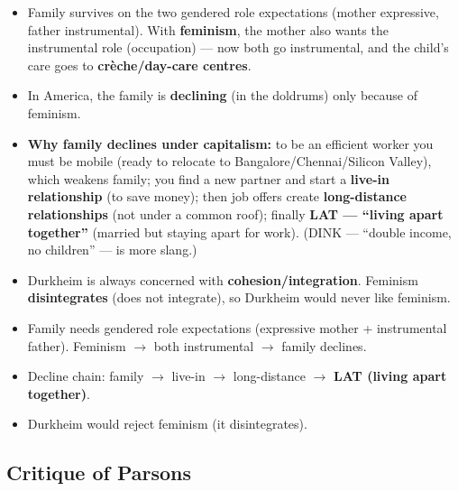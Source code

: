 \begin{CriticalPoint}
\begin{itemize}
\item Family survives on the two gendered role expectations (mother expressive, father instrumental). With \textbf{feminism}, the mother also wants the instrumental role (occupation) --- now both go instrumental, and the child's care goes to \textbf{crèche/day-care centres}.
\item In America, the family is \textbf{declining} (in the doldrums) only because of feminism.
\item \textbf{Why family declines under capitalism:} to be an efficient worker you must be mobile (ready to relocate to Bangalore/Chennai/Silicon Valley), which weakens family; you find a new partner and start a \textbf{live-in relationship} (to save money); then job offers create \textbf{long-distance relationships} (not under a common roof); finally \textbf{LAT --- ``living apart together''} (married but staying apart for work). (DINK --- ``double income, no children'' --- is more slang.)
\end{itemize}
\end{CriticalPoint}

\begin{ExampleBox}
\begin{itemize}
\item Durkheim is always concerned with \textbf{cohesion/integration}. Feminism \textbf{disintegrates} (does not integrate), so Durkheim would never like feminism.
\end{itemize}
\end{ExampleBox}

\begin{QuickRevision}
\begin{itemize}
\item Family needs gendered role expectations (expressive mother + instrumental father). Feminism $\rightarrow$ both instrumental $\rightarrow$ family declines.
\item Decline chain: family $\rightarrow$ live-in $\rightarrow$ long-distance $\rightarrow$ \textbf{LAT (living apart together)}.
\item Durkheim would reject feminism (it disintegrates).
\end{itemize}
\end{QuickRevision}

\sectiondivider

\subsection{Critique of Parsons}

